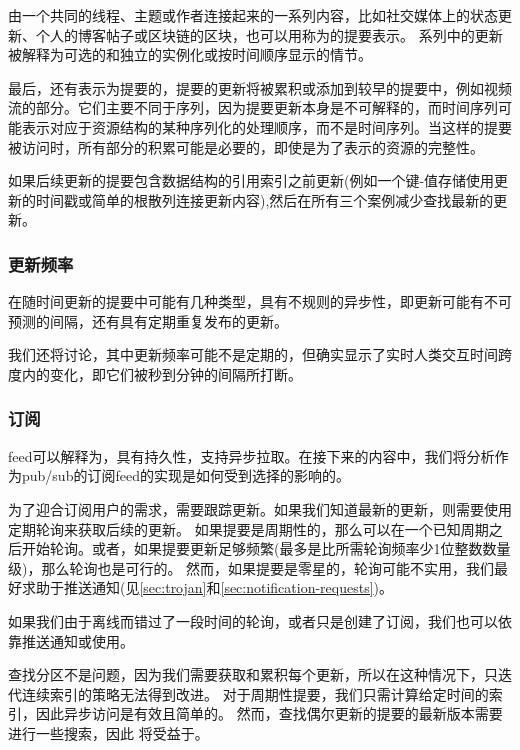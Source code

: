 由一个共同的线程、主题或作者连接起来的一系列内容，比如社交媒体上的状态更新、个人的博客帖子或区块链的区块，也可以用称为的提要表示。
系列中的更新被解释为可选的和独立的实例化或按时间顺序显示的情节。

最后，还有表示为提要的，提要的更新将被累积或添加到较早的提要中，例如视频流的部分。它们主要不同于序列，因为提要更新本身是不可解释的，而时间序列可能表示对应于资源结构的某种序列化的处理顺序，而不是时间序列。当这样的提要被访问时，所有部分的积累可能是必要的，即使是为了表示的资源的完整性。

如果后续更新的提要包含数据结构的引用索引之前更新(例如一个键-值存储使用更新的时间戳或简单的根散列连接更新内容),然后在所有三个案例减少查找最新的更新。

\subsubsection{更新频率}

在随时间更新的提要中可能有几种类型，具有不规则的异步性，即更新可能有不可预测的间隔，还有具有定期重复发布的更新。

我们还将讨论，其中更新频率可能不是定期的，但确实显示了实时人类交互时间跨度内的变化，即它们被秒到分钟的间隔所打断。

\subsubsection{订阅}

feed可以解释为，具有持久性，支持异步拉取。在接下来的内容中，我们将分析作为pub/sub的订阅feed的实现是如何受到选择的影响的。

为了迎合订阅用户的需求，需要跟踪更新。如果我们知道最新的更新，则需要使用定期轮询来获取后续的更新。
如果提要是周期性的，那么可以在一个已知周期之后开始轮询。或者，如果提要更新足够频繁(最多是比所需轮询频率少1位整数数量级)，那么轮询也是可行的。
然而，如果提要是零星的，轮询可能不实用，我们最好求助于推送通知(见\ref{sec:trojan}和\ref{sec:notification-requests})。

如果我们由于离线而错过了一段时间的轮询，或者只是创建了订阅，我们也可以依靠推送通知或使用。

查找分区不是问题，因为我们需要获取和累积每个更新，所以在这种情况下，只迭代连续索引的策略无法得到改进。
对于周期性提要，我们只需计算给定时间的索引，因此异步访问是有效且简单的。
然而，查找偶尔更新的提要的最新版本需要进行一些搜索，因此
将受益于。



